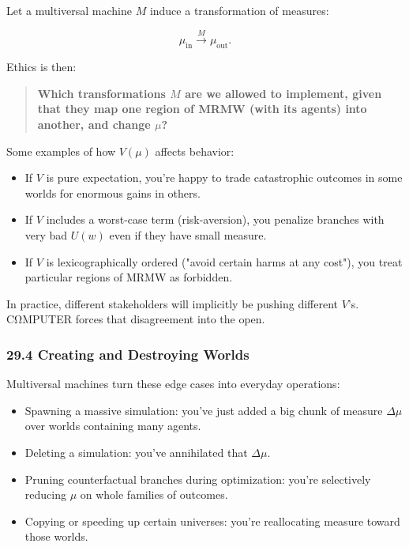 Let a multiversal machine $M$ induce a transformation of measures:

\[
  \mu_{\text{in}} \xrightarrow{M} \mu_{\text{out}}.
\]

Ethics is then:

\begin{quote}
\textbf{Which transformations $M$ are we allowed to implement, given that they map one region of MRMW (with its agents) into another, and change $\mu$?}
\end{quote}

Some examples of how $V(\mu)$ affects behavior:

\begin{itemize}
  \item If $V$ is pure expectation, you’re happy to trade catastrophic outcomes in some worlds for enormous gains in others.

  \item If $V$ includes a worst-case term (risk-aversion), you penalize branches with very bad $U(w)$ even if they have small measure.

  \item If $V$ is lexicographically ordered ("avoid certain harms at any cost"), you treat particular regions of MRMW as forbidden.
\end{itemize}

In practice, different stakeholders will implicitly be pushing different $V$'s.
CΩMPUTER forces that disagreement into the open.

\subsubsection*{29.4  Creating and Destroying Worlds}

Multiversal machines turn these edge cases into everyday operations:

\begin{itemize}
  \item Spawning a massive simulation: you’ve just added a big chunk of measure $\Delta\mu$ over worlds containing many agents.

  \item Deleting a simulation: you’ve annihilated that $\Delta\mu$.

  \item Pruning counterfactual branches during optimization: you’re selectively reducing $\mu$ on whole families of outcomes.

  \item Copying or speeding up certain universes: you’re reallocating measure toward those worlds.
\end{itemize}

